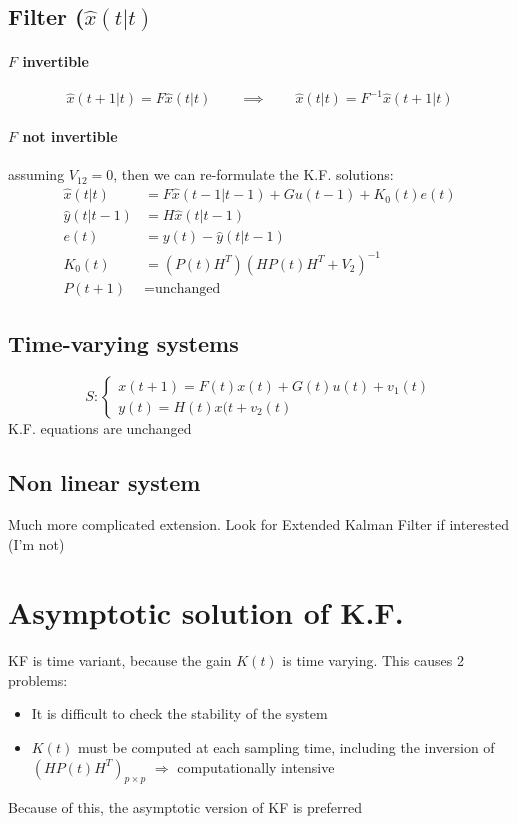 \documentclass{article}
\begin{document}
\subsection{Filter ($\hat{x}(t|t)$}
\paragraph{$F$ invertible}
\[
\hat{x}(t+1|t)=F\hat{x}(t|t)
\qquad\implies\qquad
\hat{x}(t|t)=F^{-1}\hat{x}(t+1|t)
\]
\paragraph{$F$ not invertible} assuming $V_{12}=0$, then we can re-formulate the K.F. solutions:
\begin{align*}
\hat{x}(t|t)&=F\hat{x}(t-1|t-1)+Gu(t-1)+K_0(t)e(t)\\
\hat{y}(t|t-1)&=H\hat{x}(t|t-1)\\
e(t)&=y(t)-\hat{y}(t|t-1)\\
K_0(t)&=\left(P(t)H^T\right)\left(HP(t)H^T+V_2\right)^{-1}\\
P(t+1)&=\text{unchanged }
\end{align*}
\subsection{Time-varying systems}
\[
S:\begin{cases}
x(t+1)=F(t)x(t)+G(t)u(t)+v_1(t)\\
y(t)=H(t)x(t+v_2(t)
\end{cases}
\]
K.F. equations are unchanged
\subsection{Non linear system}
Much more complicated extension. Look for Extended Kalman Filter if interested (I'm not)

\section{Asymptotic solution of K.F.}
KF is time variant, because the gain $K(t)$ is time varying. This causes 2 problems:
\begin{itemize}
\item It is difficult to check the stability of the system
\item $K(t)$ must be computed at each sampling time, including the inversion of $\left(HP(t)H^T\right)_{p\times p}$ $\Rightarrow$ computationally intensive
\end{itemize}
Because of this, the asymptotic version of KF is preferred
\end{document}
